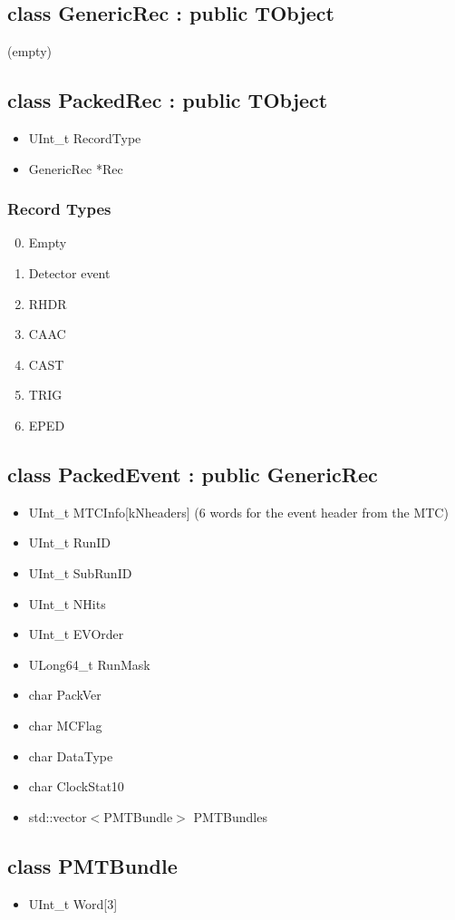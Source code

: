 \documentclass{article}
\begin{document}
\subsection{class GenericRec : public TObject}
(empty)

\subsection{class PackedRec : public TObject}
\begin{itemize}
\item UInt\_t RecordType
\item GenericRec *Rec
\end{itemize}

\subsubsection{Record Types}
\begin{enumerate}
\setcounter{enumi}{-1}
\item Empty
\item Detector event
\item RHDR
\item CAAC
\item CAST
\item TRIG
\item EPED
\end{enumerate}

\subsection{class PackedEvent : public GenericRec}
\begin{itemize}
\item UInt\_t MTCInfo[kNheaders] (6 words for the event header from the MTC)
\item UInt\_t RunID
\item UInt\_t SubRunID
\item UInt\_t NHits
\item UInt\_t EVOrder
\item ULong64\_t RunMask
\item char PackVer
\item char MCFlag
\item char DataType
\item char ClockStat10 
\item std::vector$<$PMTBundle$>$ PMTBundles
\end{itemize}

\subsection{class PMTBundle}
\begin{itemize}
\item UInt\_t Word[3] 
\end{itemize}
\end{document}
